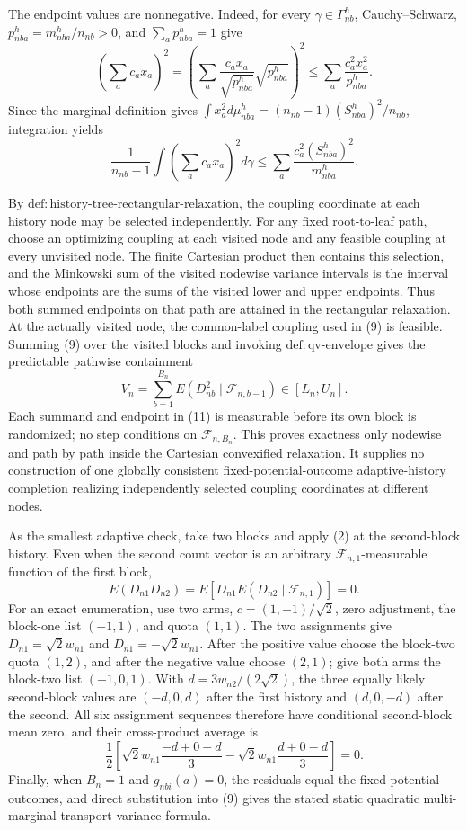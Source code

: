 The endpoint values are nonnegative. Indeed, for every \(\gamma\in\Gamma_{nb}^h\), Cauchy--Schwarz, \(p_{nba}^h=m_{nba}^h/n_{nb}>0\), and \(\sum_ap_{nba}^h=1\) give
\[
\left(\sum_ac_ax_a\right)^2
=\left(\sum_a\frac{c_ax_a}{\sqrt{p_{nba}^h}}\sqrt{p_{nba}^h}\right)^2
\le\sum_a\frac{c_a^2x_a^2}{p_{nba}^h}.
\]
Since the marginal definition gives
\(
\int x_a^2d\mu_{nba}^h=(n_{nb}-1)(S_{nba}^h)^2/n_{nb}
\), integration yields
\[
\frac1{n_{nb}-1}\int\left(\sum_ac_ax_a\right)^2d\gamma
\le\sum_a\frac{c_a^2(S_{nba}^h)^2}{m_{nba}^h}.
\tag{10}
\]

By \(\mathrm{def:history\text{-}tree\text{-}rectangular\text{-}relaxation}\), the coupling coordinate at each history node may be selected independently. For any fixed root-to-leaf path, choose an optimizing coupling at each visited node and any feasible coupling at every unvisited node. The finite Cartesian product then contains this selection, and the Minkowski sum of the visited nodewise variance intervals is the interval whose endpoints are the sums of the visited lower and upper endpoints. Thus both summed endpoints on that path are attained in the rectangular relaxation. At the actually visited node, the common-label coupling used in (9) is feasible. Summing (9) over the visited blocks and invoking \(\mathrm{def:qv\text{-}envelope}\) gives the predictable pathwise containment
\[
V_n=\sum_{b=1}^{B_n}E(D_{nb}^2\mid\mathcal F_{n,b-1})\in[L_n,U_n].
\tag{11}
\]
Each summand and endpoint in (11) is measurable before its own block is randomized; no step conditions on \(\mathcal F_{n,B_n}\). This proves exactness only nodewise and path by path inside the Cartesian convexified relaxation. It supplies no construction of one globally consistent fixed-potential-outcome adaptive-history completion realizing independently selected coupling coordinates at different nodes.

As the smallest adaptive check, take two blocks and apply (2) at the second-block history. Even when the second count vector is an arbitrary \(\mathcal F_{n,1}\)-measurable function of the first block,
\[
E(D_{n1}D_{n2})=E\!\left[D_{n1}E(D_{n2}\mid\mathcal F_{n,1})\right]=0.
\tag{12}
\]
For an exact enumeration, use two arms, \(c=(1,-1)/\sqrt2\), zero adjustment, the block-one list \((-1,1)\), and quota \((1,1)\). The two assignments give \(D_{n1}=\sqrt2w_{n1}\) and \(D_{n1}=-\sqrt2w_{n1}\). After the positive value choose the block-two quota \((1,2)\), and after the negative value choose \((2,1)\); give both arms the block-two list \((-1,0,1)\). With \(d=3w_{n2}/(2\sqrt2)\), the three equally likely second-block values are \((-d,0,d)\) after the first history and \((d,0,-d)\) after the second. All six assignment sequences therefore have conditional second-block mean zero, and their cross-product average is
\[
\frac12\left[\sqrt2w_{n1}\frac{-d+0+d}{3}
-\sqrt2w_{n1}\frac{d+0-d}{3}\right]=0.
\tag{13}
\]
Finally, when \(B_n=1\) and \(g_{nbi}(a)=0\), the residuals equal the fixed potential outcomes, and direct substitution into (9) gives the stated static quadratic multi-marginal-transport variance formula.